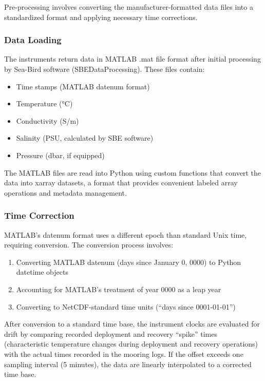 Pre-processing involves converting the manufacturer-formatted data files into a standardized format and applying necessary time corrections.

\subsubsection{Data Loading}
The instruments return data in MATLAB .mat file format after initial processing by Sea-Bird software (SBEDataProcessing). These files contain:
\begin{itemize}
    \item Time stamps (MATLAB datenum format)
    \item Temperature (°C)
    \item Conductivity (S/m)
    \item Salinity (PSU, calculated by SBE software)
    \item Pressure (dbar, if equipped)
\end{itemize}

The MATLAB files are read into Python using custom functions that convert the data into xarray datasets, a format that provides convenient labeled array operations and metadata management.

\subsubsection{Time Correction}

MATLAB's datenum format uses a different epoch than standard Unix time, requiring conversion. The conversion process involves:
\begin{enumerate}
    \item Converting MATLAB datenum (days since January 0, 0000) to Python datetime objects
    \item Accounting for MATLAB's treatment of year 0000 as a leap year
    \item Converting to NetCDF-standard time units (``days since 0001-01-01'')
\end{enumerate}

After conversion to a standard time base, the instrument clocks are evaluated for drift by comparing recorded deployment and recovery ``spike'' times (characteristic temperature changes during deployment and recovery operations) with the actual times recorded in the mooring logs. If the offset exceeds one sampling interval (5 minutes), the data are linearly interpolated to a corrected time base.


